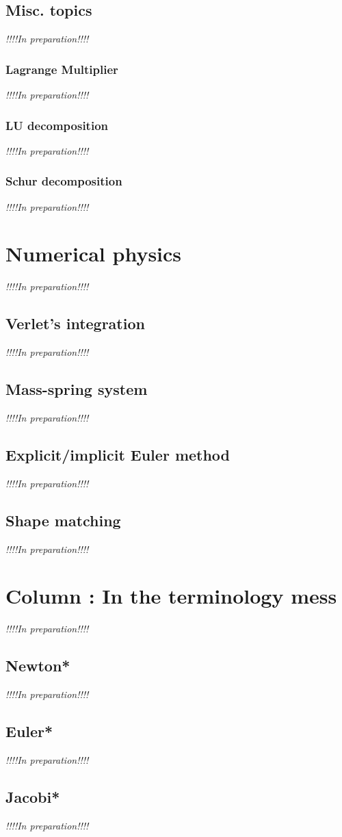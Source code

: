 \documentclass[pdflatex,sn-mathphys-num]{sn-jnl}%
\theoremstyle{thmstyleone}%
\theoremstyle{thmstyletwo}%
\theoremstyle{thmstylethree}%
\newcommand{\inprep}{
	\begin{center}
		\sl\rm {!!!!In preparation!!!!}
\end{center}}
\begin{document}
\subsection{Misc. topics}
\inprep
\subsubsection{Lagrange Multiplier}
\inprep
\subsubsection{LU decomposition}
\inprep
\subsubsection{Schur decomposition}
\inprep

\section{Numerical physics}
\inprep
\subsection{Verlet's integration}
\inprep
\subsection{Mass-spring system}
\inprep
\subsection{Explicit/implicit Euler method}
\inprep
\subsection{Shape matching}
\inprep

\section{Column : In the terminology mess}
\inprep
\subsection{Newton*}
\inprep
\subsection{Euler*}
\inprep
\subsection{Jacobi*}
\inprep
\end{document}
